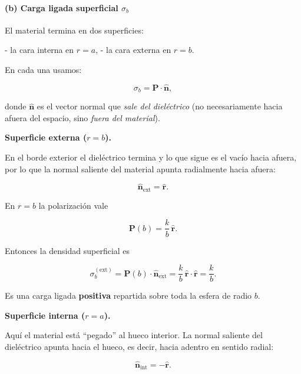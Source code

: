 \documentclass{article}
\begin{document}
\paragraph{(b) Carga ligada superficial $\sigma_{b}$}

El material termina en dos superficies:

- la cara interna en $r=a$,  
- la cara externa en $r=b$.

En cada una usamos:

\[
\sigma_{b} = \mathbf{P}\cdot\hat{\mathbf{n}},
\]

donde $\hat{\mathbf{n}}$ es el vector normal que \emph{sale del dieléctrico}
(no necesariamente hacia afuera del espacio, sino \emph{fuera del material}).

\medskip

\textbf{Superficie externa ($r=b$).}  

En el borde exterior el dieléctrico termina y lo que sigue es el vacío hacia
afuera, por lo que la normal saliente del material apunta radialmente hacia
afuera:

\begin{equation}
\hat{\mathbf{n}}_{\text{ext}} = \hat{\mathbf{r}}.
\label{eq:n-ext}
\end{equation}

En $r=b$ la polarización vale

\begin{equation}
\mathbf{P}(b) = \frac{k}{b}\,\hat{\mathbf{r}}.
\label{eq:P-b}
\end{equation}

Entonces la densidad superficial es

\begin{equation}
\sigma_{b}^{(\text{ext})}
= \mathbf{P}(b)\cdot\hat{\mathbf{n}}_{\text{ext}}
= \frac{k}{b}\,\hat{\mathbf{r}}\cdot\hat{\mathbf{r}}
= \frac{k}{b}.
\label{eq:sigma-ext}
\end{equation}

Es una carga ligada \textbf{positiva} repartida sobre toda la esfera de radio
$b$.

\medskip

\textbf{Superficie interna ($r=a$).}  

Aquí el material está “pegado” al hueco interior.  
La normal saliente del dieléctrico apunta hacia el hueco, es decir, hacia
adentro en sentido radial:

\begin{equation}
\hat{\mathbf{n}}_{\text{int}} = -\hat{\mathbf{r}}.
\label{eq:n-int}
\end{equation}
\end{document}
